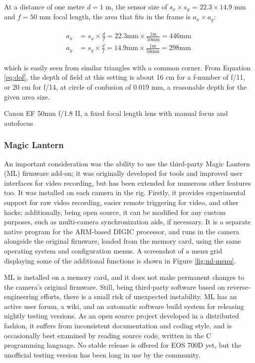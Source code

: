 At a distance of one metre $d = 1$ m, the sensor size of $s_x \times s_y$ = $22.3 \times 14.9$ mm and $f = 50$ mm focal length, the area that fits in the frame is $a_x \times a_y$:

\begin{align} \label{equ:areasize} \begin{split}
	a_x &= s_x \times \frac{d}{f} = 22.3 \text{mm} \times \frac{1 \text{m}}{50 \text{mm}} = 446 \text{mm}\\
	a_y &= s_y \times \frac{d}{f} = 14.9 \text{mm} \times \frac{1 \text{m}}{50 \text{mm}} = 298 \text{mm}
\end{split} \end{align}

which is easily seen from similar triangles with a common corner.
From Equation \ref{eq:dof}, the depth of field at this setting is about 16 cm for a f-number of f/11, or 20 cm for f/14, at circle of confusion of 0.019 mm, a reasonable depth for the given area size.

{Canon EF 50mm f/1.8 II, a fixed focal length lens with manual focus and autofocus}

\subsubsection{Magic Lantern}

An important consideration was the ability to use the third-party Magic Lantern (ML) firmware add-on;
it was originally developed for tools and improved user interfaces for video recording, but has been extended for numerous other features too.
It was installed on each camera in the rig.
Firstly, it provides experimental support for raw video recording, easier remote triggering for video, and other hacks;
additionally, being open source, it can be modified for any custom purposes, such as multi-camera synchronization aids, if necessary.
It is a separate native program for the ARM-based DIGIC processor, and runs in the camera alongside the original firmware, loaded from the memory card, using the same operating system and configuration menus. \cite{magiclantern}
A screenshot of a menu grid displaying some of the additional functions is shown in Figure \ref{fig:ml-menu}.

ML is installed on a memory card, and it does not make permanent changes to the camera's original firmware.
Still, being third-party software based on reverse-engineering efforts, there is a small risk of unexpected instability.
ML has an active user forum, a wiki, and an automatic software build system for releasing nightly testing versions.
As an open source project developed in a distributed fashion, it suffers from inconsistent documentation and coding style, and is occasionally best examined by reading source code, written in the C programming language.
No stable release is offered for EOS 700D yet, but the unofficial testing version has been long in use by the community. \cite{magiclantern}

